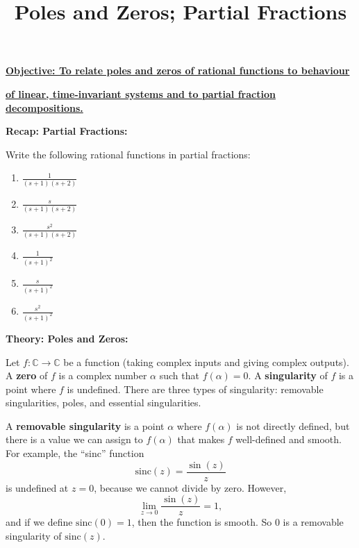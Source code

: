 \documentclass{article}
\newcommand{\sinc}{\mathrm{sinc}}
\begin{document}
\title{Poles and Zeros; Partial Fractions}
\date{}

\maketitle
\thispagestyle{empty}

\Large

\vskip -10mm

\textbf{\underline{Objective: To relate poles and zeros of rational functions to behaviour}}

\textbf{\underline{of linear, time-invariant systems and to partial fraction decompositions.}}



\vspace{5mm}



\textbf{Recap: Partial Fractions:}\bigskip

Write the following rational functions in partial fractions:

\begin{enumerate}
	\item $\frac{1}{(s+1)(s+2)}$
	\item $\frac{s}{(s+1)(s+2)}$
	\item $\frac{s^2}{(s+1)(s+2)}$
	\item $\frac{1}{(s+1)^2}$
	\item $\frac{s}{(s+1)^2}$
	\item $\frac{s^2}{(s+1)^2}$
\end{enumerate}







\clearpage


\textbf{Theory: Poles and Zeros:}\bigskip



Let $f:\mathbb{C}\to\mathbb{C}$ be a function (taking complex inputs and giving complex outputs). A \textbf{zero} of $f$ is a complex number $\alpha$ such that $f(\alpha)=0$. A \textbf{singularity} of $f$ is a point where $f$ is undefined. There are three types of singularity: removable singularities, poles, and essential singularities.

A \textbf{removable singularity} is a point $\alpha$ where $f(\alpha)$ is not directly defined, but there is a value we can assign to $f(\alpha)$ that makes $f$ well-defined and smooth. For example, the ``sinc'' function
	\[\sinc(z)=\frac{\sin(z)}{z}\]
is undefined at $z=0$, because we cannot divide by zero. However,
	\[\lim_{z\to 0} \frac{\sin(z)}{z}=1,\]
and if we define $\sinc(0)=1$, then the function is smooth. So 0 is a removable singularity of $\sinc(z)$.
\end{document}
